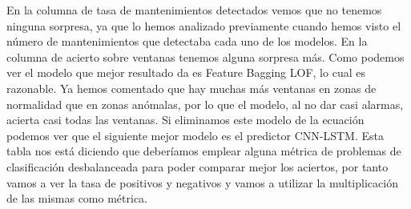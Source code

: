 En la columna de tasa de mantenimientos detectados vemos que no tenemos ninguna sorpresa, ya que lo hemos analizado previamente cuando hemos visto el número de mantenimientos que detectaba cada uno de los modelos. En la columna de acierto sobre ventanas tenemos alguna sorpresa más. Como podemos ver el modelo que mejor resultado da es Feature Bagging LOF, lo cual es razonable. Ya hemos comentado que hay muchas más ventanas en zonas de normalidad que en zonas anómalas, por lo que el modelo, al no dar casi alarmas, acierta casi todas las ventanas. Si eliminamos este modelo de la ecuación podemos ver que el siguiente mejor modelo es el predictor CNN-LSTM. Esta tabla nos está diciendo que deberíamos emplear alguna métrica de problemas de clasificación desbalanceada para poder comparar mejor los aciertos, por tanto vamos a ver la tasa de positivos y negativos y vamos a utilizar la multiplicación de las mismas como métrica.

